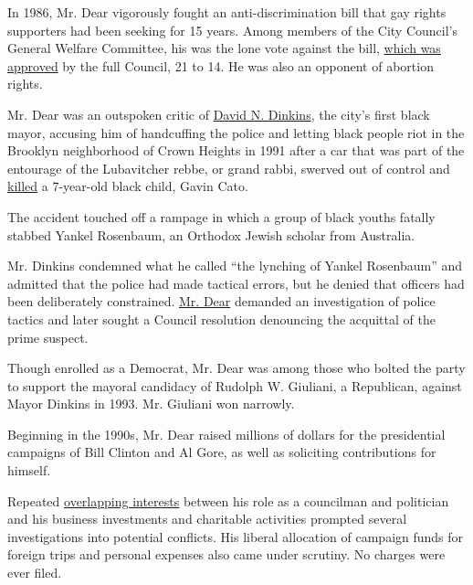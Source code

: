 In 1986, Mr. Dear vigorously fought an anti-discrimination bill that gay
rights supporters had been seeking for 15 years. Among members of the
City Council's General Welfare Committee, his was the lone vote against
the bill,
\href{https://www.nytimes3xbfgragh.onion/1986/03/21/nyregion/homosexual-rights-bill-is-passed-by-city-council-in-21-to-14-vote.html}{which
was approved} by the full Council, 21 to 14. He was also an opponent of
abortion rights.

Mr. Dear was an outspoken critic of
\href{https://www.nytimes3xbfgragh.onion/2017/11/10/nyregion/david-dinkins-doesnt-think-he-failed-he-might-be-right.html}{David
N. Dinkins}, the city's first black mayor, accusing him of handcuffing
the police and letting black people riot in the Brooklyn neighborhood of
Crown Heights in 1991 after a car that was part of the entourage of the
Lubavitcher rebbe, or grand rabbi, swerved out of control and
\href{https://www.nytimes3xbfgragh.onion/1996/08/15/nyregion/the-case-that-rocked-crown-heights.html}{killed}
a 7-year-old black child, Gavin Cato.

The accident touched off a rampage in which a group of black youths
fatally stabbed Yankel Rosenbaum, an Orthodox Jewish scholar from
Australia.

Mr. Dinkins condemned what he called ``the lynching of Yankel
Rosenbaum'' and admitted that the police had made tactical errors, but
he denied that officers had been deliberately constrained.
\href{https://www.nytimes3xbfgragh.onion/1992/11/14/nyregion/dinkins-issues-appeal-on-crown-heights-debate.html}{Mr.
Dear} demanded an investigation of police tactics and later sought a
Council resolution denouncing the acquittal of the prime suspect.

Though enrolled as a Democrat, Mr. Dear was among those who bolted the
party to support the mayoral candidacy of Rudolph W. Giuliani, a
Republican, against Mayor Dinkins in 1993. Mr. Giuliani won narrowly.

Beginning in the 1990s, Mr. Dear raised millions of dollars for the
presidential campaigns of Bill Clinton and Al Gore, as well as
soliciting contributions for himself.

Repeated
\href{https://www.nytimes3xbfgragh.onion/1991/05/22/nyregion/noach-dear-master-of-overlapping-interests.html}{overlapping
interests} between his role as a councilman and politician and his
business investments and charitable activities prompted several
investigations into potential conflicts. His liberal allocation of
campaign funds for foreign trips and personal expenses also came under
scrutiny. No charges were ever filed.

